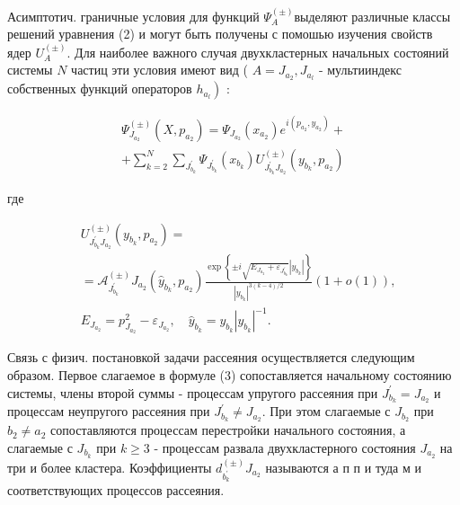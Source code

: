 \documentclass[10pt]{article}
\begin{document}
Асимптотич. граничные условия для функций $\Psi_{A}^{( \pm)}$выделяют различные классы решений уравнения (2) и могут быть получены с помошью изучения свойств ядер $U_{A}^{( \pm)}$. Для наиболее важного случая двухкластерных начальных состояний системы $N$ частиц эти условия имеют вид ( $A=J_{a_{2}}, J_{a_{l}}$ - мультииндекс собственных функций операторов $\left.h_{a_{l}}\right)$ :



\[

\begin{gathered}

\Psi_{J_{a_{2}}}^{( \pm)}\left(X, p_{a_{2}}\right)=\Psi_{J_{a_{2}}}\left(x_{a_{2}}\right) e^{i\left(p_{a_{2}}, y_{a_{2}}\right)}+ \\

+\sum_{k=2}^{N} \sum_{J_{b_{k}}^{\prime}} \Psi_{J_{b_{k}}^{\prime}}\left(x_{b_{k}}\right) U_{J_{b_{k}}^{\prime} J_{a_{2}}}^{( \pm)}\left(y_{b_{k}}, p_{a_{2}}\right)

\end{gathered}

\]



где



\[

\begin{aligned}

& U_{J_{b_{k}}^{\prime} J_{a_{2}}}^{( \pm)}\left(y_{b_{k}}, p_{a_{2}}\right)= \\

& =\mathscr{A}_{J_{b_{k}}^{\prime}}^{( \pm)} J_{a_{2}}\left(\hat{y}_{b_{k}}, p_{a_{2}}\right) \frac{\exp \left\{ \pm i \sqrt{E_{J_{a_{2}}}+\varepsilon_{J_{b_{k}}^{\prime}}}\left|y_{b_{k}}\right|\right\}}{\left|y_{b_{k}}\right|^{3(k-4) / 2}}(1+o(1)), \\

& E_{J_{a_{2}}}=p_{J_{a_{2}}}^{2}-\varepsilon_{J_{a_{2}}}, \quad \hat{y}_{b_{k}}=y_{b_{k}}\left|y_{b_{k}}\right|^{-1} .

\end{aligned}

\]



Связь с физич. постановкой задачи рассеяния осуществляется следующим образом. Первое слагаемое в формуле (3) сопоставляется начальному состоянию системы, члены второй суммы - процессам упругого рассеяния при $J_{b_{k}}^{\prime}=J_{a_{2}}$ и процессам неупругого рассеяния при $J_{b_{k}}^{\prime} \neq J_{a_{2}}$. При этом слагаемые с $J_{b_{2}}$ при $b_{2} \neq a_{2}$ сопоставляются процессам перестройки начального состояния, а слагаемые с $J_{b_{k}}$ при $k \geqslant 3$ - процессам развала двухкластерного состояния $J_{a_{2}}$ на три и более кластера. Коэффициенты $d_{b_{k}^{\prime}}^{( \pm)} J_{a_{2}}$ называются а п п и туда м и соответствующих процессов рассеяния.
\end{document}
